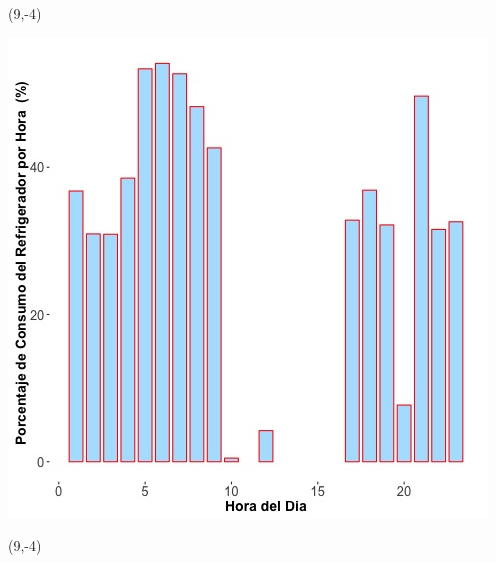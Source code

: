 \documentclass{article}\usepackage[]{graphicx}\usepackage[]{color}
\newenvironment{knitrout}{}{} %
\begin{document}
 \begin{textblock}{1}(9,-4)
\begin{minipage}{20em}
\begingroup

\endgroup
\end{minipage}
\end{textblock}

 \vspace{2cm}

\begin{knitrout}
\color{fgcolor}
\includegraphics[scale=0.65]{figure/A18_fridge_energy_pct.jpg} 
\end{knitrout}

 \begin{textblock}{1}(9,-4)
\begin{minipage}{20em}
\begingroup

\endgroup
\end{minipage}
\end{textblock}

\vspace{20cm}
\end{document}

